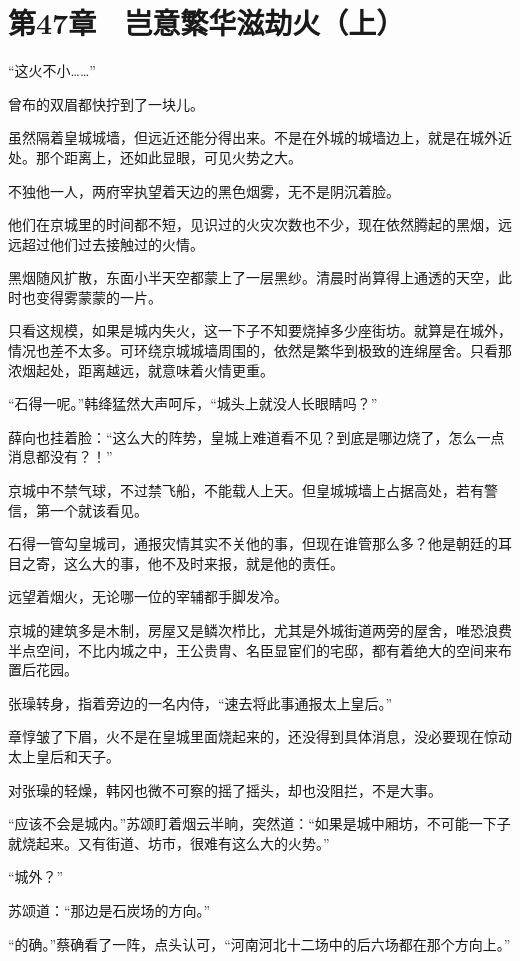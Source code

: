 \section{第47章　岂意繁华滋劫火（上）}

“这火不小……”

曾布的双眉都快拧到了一块儿。

虽然隔着皇城城墙，但远近还能分得出来。不是在外城的城墙边上，就是在城外近处。那个距离上，还如此显眼，可见火势之大。

不独他一人，两府宰执望着天边的黑色烟雾，无不是阴沉着脸。

他们在京城里的时间都不短，见识过的火灾次数也不少，现在依然腾起的黑烟，远远超过他们过去接触过的火情。

黑烟随风扩散，东面小半天空都蒙上了一层黑纱。清晨时尚算得上通透的天空，此时也变得雾蒙蒙的一片。

只看这规模，如果是城内失火，这一下子不知要烧掉多少座街坊。就算是在城外，情况也差不太多。可环绕京城城墙周围的，依然是繁华到极致的连绵屋舍。只看那浓烟起处，距离越远，就意味着火情更重。

“石得一呢。”韩绛猛然大声呵斥，“城头上就没人长眼睛吗？”

薛向也挂着脸：“这么大的阵势，皇城上难道看不见？到底是哪边烧了，怎么一点消息都没有？！”

京城中不禁气球，不过禁飞船，不能载人上天。但皇城城墙上占据高处，若有警信，第一个就该看见。

石得一管勾皇城司，通报灾情其实不关他的事，但现在谁管那么多？他是朝廷的耳目之寄，这么大的事，他不及时来报，就是他的责任。

远望着烟火，无论哪一位的宰辅都手脚发冷。

京城的建筑多是木制，房屋又是鳞次栉比，尤其是外城街道两旁的屋舍，唯恐浪费半点空间，不比内城之中，王公贵胄、名臣显宦们的宅邸，都有着绝大的空间来布置后花园。

张璪转身，指着旁边的一名内侍，“速去将此事通报太上皇后。”

章惇皱了下眉，火不是在皇城里面烧起来的，还没得到具体消息，没必要现在惊动太上皇后和天子。

对张璪的轻燥，韩冈也微不可察的摇了摇头，却也没阻拦，不是大事。

“应该不会是城内。”苏颂盯着烟云半晌，突然道：“如果是城中厢坊，不可能一下子就烧起来。又有街道、坊市，很难有这么大的火势。”

“城外？”

苏颂道：“那边是石炭场的方向。”

“的确。”蔡确看了一阵，点头认可，“河南河北十二场中的后六场都在那个方向上。”

